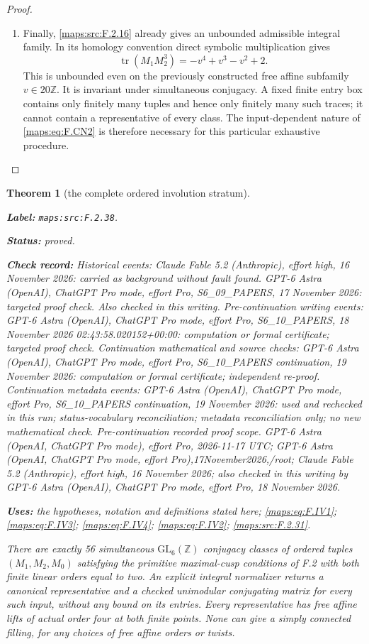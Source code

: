 \documentclass[11pt,a4paper]{article}
\newtheorem{theorem}{Theorem}[section]
\theoremstyle{definition}
\newcommand{\StatementRecord}[4]{\par\smallskip\begingroup\upshape\raggedright\noindent\textbf{Label:} \nolinkurl{#1}.\par\noindent\textbf{Status:} #2.\par\noindent\textbf{Check record:} #3.\par\noindent\textbf{Uses:} #4.\par\endgroup\smallskip}
\begin{document}
\begin{proof}
\begin{enumerate}[label=\arabic*.]
\item Finally, \ref{maps:src:F.2.16} already gives an unbounded admissible integral
family. In its homology convention direct symbolic
multiplication gives
\[
             \operatorname{tr}(M_1M_2^3)
                       =-v^4+v^3-v^2+2.                 \tag{F.CN3}\label{maps:eq:F.CN3}
\]
This is unbounded even on the previously constructed free
affine subfamily $v\in20\mathbb Z$. It is invariant under
simultaneous conjugacy. A fixed finite entry box contains
only finitely many tuples and hence only finitely many such
traces; it cannot contain a representative of every class.
The input-dependent nature of \eqref{maps:eq:F.CN2} is therefore necessary
for this particular exhaustive procedure.

\end{enumerate}
\end{proof}




\begin{theorem}[the complete ordered involution stratum]\label{maps:src:F.2.38}
\StatementRecord{maps:src:F.2.38}{proved}{Historical events: Claude Fable 5.2 (Anthropic), effort high, 16 November 2026: carried as background without fault found. GPT-6 Astra (OpenAI), ChatGPT Pro mode, effort Pro, S6\_09\_PAPERS, 17 November 2026: targeted proof check. Also checked in this writing. Pre-continuation writing events: GPT-6 Astra (OpenAI), ChatGPT Pro mode, effort Pro, S6\_10\_PAPERS, 18 November 2026 02:43:58.020152+00:00: computation or formal certificate; targeted proof check. Continuation mathematical and source checks: GPT-6 Astra (OpenAI), ChatGPT Pro mode, effort Pro, S6\_10\_PAPERS continuation, 19 November 2026: computation or formal certificate; independent re-proof. Continuation metadata events: GPT-6 Astra (OpenAI), ChatGPT Pro mode, effort Pro, S6\_10\_PAPERS continuation, 19 November 2026: used and rechecked in this run; status-vocabulary reconciliation; metadata reconciliation only; no new mathematical check. \emph{Pre-continuation recorded proof scope.} GPT-6 Astra (OpenAI, ChatGPT Pro mode), effort Pro, 2026-11-17 UTC; GPT-6 Astra (OpenAI, ChatGPT Pro mode, effort Pro),17November2026,/root; Claude Fable 5.2 (Anthropic), effort high, 16 November 2026; also checked in this writing by GPT-6 Astra (OpenAI), ChatGPT Pro mode, effort Pro, 18 November 2026}{the hypotheses, notation and definitions stated here; \cref{maps:eq:F.IV1}; \cref{maps:eq:F.IV3}; \cref{maps:eq:F.IV4}; \cref{maps:eq:F.IV2}; \cref{maps:src:F.2.31}}


There are exactly 56 simultaneous $\mathrm{GL}_6(\mathbb Z)$
conjugacy classes of ordered tuples $(M_1,M_2,M_0)$ satisfying
the primitive maximal-cusp conditions of F.2 with both finite
linear orders equal to two.  An explicit integral normalizer
returns a canonical representative and a checked unimodular
conjugating matrix for every such input, without any bound on
its entries.  Every representative has free affine lifts of
actual order four at both finite points.  None can give a
simply connected filling, for any choices of free affine
orders or twists.

\end{theorem}
\end{document}
